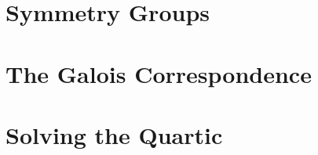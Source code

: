 \documentclass[reqno, 12pt, letter]{article}
\theoremstyle{plain}
\theoremstyle{definition}
\theoremstyle{remark}
\numberwithin{equation}{section}
\begin{document}
\newpage
\section{Symmetry Groups}

\newpage
\section{The Galois Correspondence}

\newpage
\section{Solving the Quartic}


\end{document}

